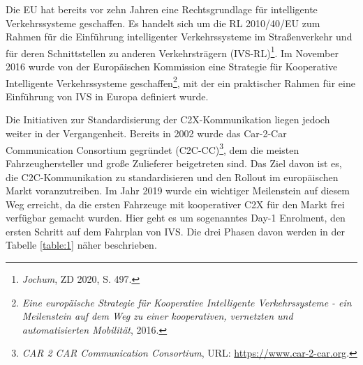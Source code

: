 Die EU hat bereits vor zehn Jahren eine Rechtsgrundlage für intelligente Verkehrssysteme geschaffen. Es handelt sich um die RL 2010/40/EU zum Rahmen für die Einführung intelligenter Verkehrssysteme im Straßenverkehr und für deren Schnittstellen zu anderen Verkehrsträgern (IVS-RL)\footnote{\emph{Jochum}, ZD 2020, S. 497.}. Im November 2016 wurde von der Europäischen Kommission eine Strategie für Kooperative Intelligente Verkehrssysteme geschaffen\footnote{\emph{Eine europäische Strategie für Kooperative Intelligente Verkehrssysteme - ein Meilenstein auf dem Weg zu einer kooperativen, vernetzten und automatisierten Mobilität}, 2016.}\nocite{CITS2016}, mit der ein praktischer Rahmen für eine Einführung von IVS in Europa definiert wurde. 

Die Initiativen zur Standardisierung der C2X-Kommunikation liegen jedoch weiter in der Vergangenheit. Bereits in 2002 wurde das Car-2-Car Communication Consortium gegründet (C2C-CC)\footnote{\emph{CAR 2 CAR Communication Consortium}, URL: \url{https://www.car-2-car.org}.}\nocite{Car2Car}, dem die meisten Fahrzeughersteller und große Zulieferer beigetreten sind. Das Ziel davon ist es, die C2C-Kommunikation zu standardisieren und den Rollout im europäischen Markt voranzutreiben. Im Jahr 2019 wurde ein wichtiger Meilenstein auf diesem Weg erreicht, da die ersten Fahrzeuge mit kooperativer C2X für den Markt frei verfügbar gemacht wurden. Hier geht es um sogenanntes Day-1 Enrolment, den ersten Schritt auf dem Fahrplan von IVS. Die drei Phasen davon werden in der Tabelle \ref{table:1} näher beschrieben.

